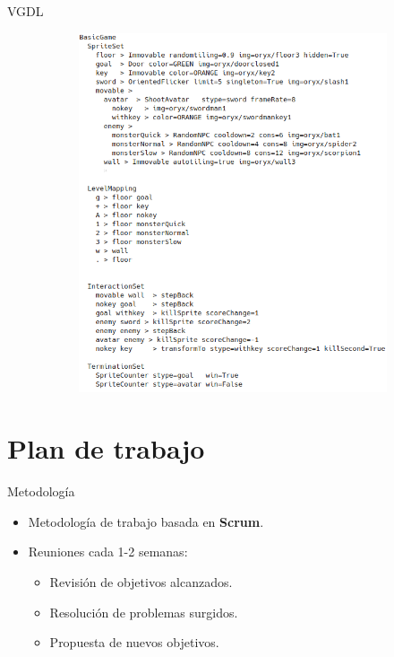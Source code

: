\documentclass[11pt]{beamer}    %
\begin{document}
\begin{frame}{VGDL}
\begin{figure}
\begin{subfigure}{0.5\textwidth}
                \includegraphics[scale=0.4]{img/presentation/game_def}
            \end{subfigure}
        \end{figure}
    \end{frame}

    \section{Plan de trabajo}

    \begin{frame}{Metodología}
        \begin{itemize}
            \item Metodología de trabajo basada en \textbf{Scrum}.
            \item Reuniones cada 1-2 semanas:
                \begin{itemize}
                    \item Revisión de objetivos alcanzados.
                    \item Resolución de problemas surgidos.
                    \item Propuesta de nuevos objetivos.
                \end{itemize}
        \end{itemize}
    \end{frame}
\end{document}
